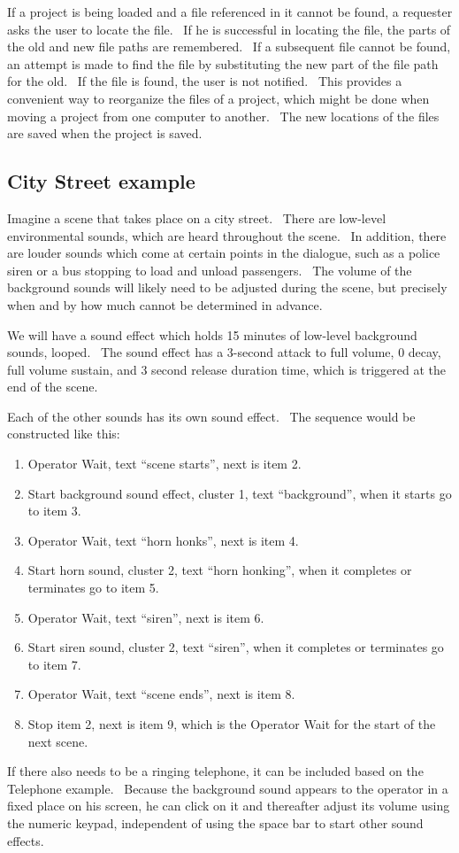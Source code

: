 \documentclass[letterpaper]{article}
\newcommand\liststyleLxxiii{%
\renewcommand\theenumi{\arabic{enumi}}
\renewcommand\theenumii{\arabic{enumii}}
\renewcommand\theenumiii{\arabic{enumiii}}
\renewcommand\theenumiv{\arabic{enumiv}}
\renewcommand\labelenumi{\theenumi.}
\renewcommand\labelenumii{\theenumii.}
\renewcommand\labelenumiii{\theenumiii.}
\renewcommand\labelenumiv{\theenumiv.}
}
\begin{document}
If a project is being loaded and a file referenced in it cannot be
found, a requester asks the user to locate the file. \ If he is
successful in locating the file, the parts of the old and new file
paths are remembered. \ If a subsequent file cannot be found, an
attempt is made to find the file by substituting the new part of the
file path for the old. \ If the file is found, the user is not
notified. \ This provides a convenient way to reorganize the files of a
project, which might be done when moving a project from one computer to
another. \ The new locations of the files are saved when the project is
saved.

\subsection{City Street example}
Imagine a scene that takes place on a city street. \ There are low-level
environmental sounds, which are heard throughout the scene. \ In
addition, there are louder sounds which come at certain points in the
dialogue, such as a police siren or a bus stopping to load and unload
passengers. \ The volume of the background sounds will likely need to
be adjusted during the scene, but precisely when and by how much cannot
be determined in advance.

We will have a sound effect which holds 15 minutes of low-level
background sounds, looped. \ The sound effect has a 3-second attack to
full volume, 0 decay, full volume sustain, and 3 second release
duration time, which is triggered at the end of the scene.

Each of the other sounds has its own sound effect. \ The sequence would
be constructed like this:

\liststyleLxxiii
\begin{enumerate}
\item Operator Wait, text “scene starts”, next is item 2.
\item Start background sound effect, cluster 1, text “background”, when
it starts go to item 3.
\item Operator Wait, text “horn honks”, next is item 4.
\item Start horn sound, cluster 2, text “horn honking”, when it
completes or terminates go to item 5.
\item Operator Wait, text “siren”, next is item 6.
\item Start siren sound, cluster 2, text “siren”, when it completes or
terminates go to item 7.
\item Operator Wait, text “scene ends”, next is item 8.
\item Stop item 2, next is item 9, which is the Operator Wait for the
start of the next scene.
\end{enumerate}
If there also needs to be a ringing telephone, it can be included based
on the Telephone example. \ Because the background sound appears to the
operator in a fixed place on his screen, he can click on it and
thereafter adjust its volume using the numeric keypad, independent of
using the space bar to start other sound effects.
\end{document}
